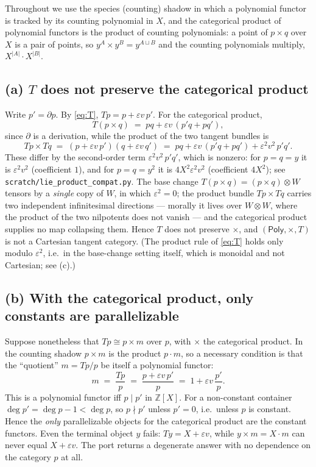 \documentclass[11pt]{article}
\theoremstyle{definition}
\newcommand{\Poly}{\mathsf{Poly}}
\newcommand{\Z}{\mathbb{Z}}
\begin{document}
Throughout we use the species (counting) shadow in which a polynomial functor is tracked by its
counting polynomial in $X$, and the categorical product of polynomial functors is the product of
counting polynomials: a point of $p\times q$ over $X$ is a pair of points, so
$y^A\times y^B = y^{A\sqcup B}$ and the counting polynomials multiply, $X^{|A|}\cdot X^{|B|}$.

\subsection*{(a) $T$ does not preserve the categorical product}

Write $p'=\partial p$. By \eqref{eq:T}, $Tp = p + \varepsilon v\,p'$. For the categorical product,
\[
   T(p\times q) \;=\; pq + \varepsilon v\,(p'q + pq'),
\]
since $\partial$ is a derivation, while the product of the two tangent bundles is
\[
   Tp\times Tq \;=\; (p+\varepsilon v\,p')(q+\varepsilon v\,q')
   \;=\; pq + \varepsilon v\,(p'q+pq') + \varepsilon^2 v^2\, p'q'.
\]
These differ by the second-order term $\varepsilon^2 v^2\,p'q'$, which is nonzero: for $p=q=y$ it
is $\varepsilon^2 v^2$ (coefficient $1$), and for $p=q=y^2$ it is $4X^2\varepsilon^2v^2$
(coefficient $4X^2$); see \texttt{scratch/lie\_product\_compat.py}. The base change
$T(p\times q)=(p\times q)\otimes W$ tensors by a \emph{single} copy of $W$, in which
$\varepsilon^2=0$; the product bundle $Tp\times Tq$ carries two independent infinitesimal
directions --- morally it lives over $W\otimes W$, where the product of the two nilpotents does
not vanish --- and the categorical product supplies no map collapsing them. Hence $T$ does not
preserve $\times$, and $(\Poly,\times,T)$ is not a Cartesian tangent category. (The product rule
of \eqref{eq:T} holds only modulo $\varepsilon^2$, i.e.\ in the base-change setting itself, which
is monoidal and not Cartesian; see (c).)

\subsection*{(b) With the categorical product, only constants are parallelizable}

Suppose nonetheless that $Tp\cong p\times m$ over $p$, with $\times$ the categorical product. In
the counting shadow $p\times m$ is the product $p\cdot m$, so a necessary condition is that the
``quotient'' $m = Tp/p$ be itself a polynomial functor:
\[
   m \;=\; \frac{Tp}{p} \;=\; \frac{p+\varepsilon v\,p'}{p} \;=\; 1 + \varepsilon v\,\frac{p'}{p}.
\]
This is a polynomial functor iff $p \mid p'$ in $\Z[X]$. For a non-constant container
$\deg p' = \deg p - 1 < \deg p$, so $p\nmid p'$ unless $p'=0$, i.e.\ unless $p$ is constant. Hence
the \emph{only} parallelizable objects for the categorical product are the constant functors.
Even the terminal object $y$ fails: $Ty = X + \varepsilon v$, while $y\times m = X\cdot m$ can
never equal $X+\varepsilon v$. The port returns a degenerate answer with no dependence on the
category $p$ at all.
\end{document}
